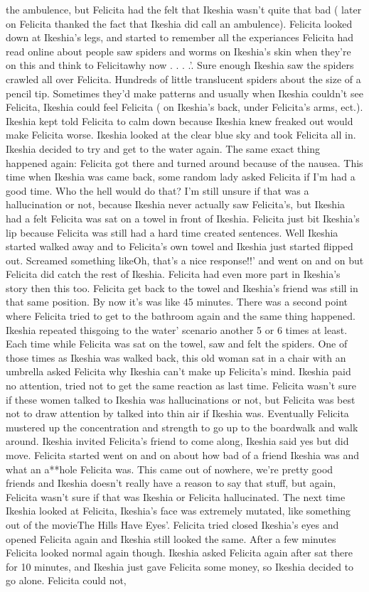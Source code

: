 \documentclass[12pt]{book}
\begin{document}
the ambulence, but Felicita had the felt that Ikeshia wasn't quite that bad ( later on Felicita thanked the fact that Ikeshia did call an ambulence). Felicita looked down at Ikeshia's legs, and started to remember all the experiances Felicita had read online about people saw spiders and worms on Ikeshia's skin when they're on this and think to Felicitawhy now . . .  .'. Sure enough Ikeshia saw the spiders crawled all over Felicita. Hundreds of little translucent spiders about the size of a pencil tip. Sometimes they'd make patterns and usually when Ikeshia couldn't see Felicita, Ikeshia could feel Felicita ( on Ikeshia's back, under Felicita's arms, ect.). Ikeshia kept told Felicita to calm down because Ikeshia knew freaked out would make Felicita worse. Ikeshia looked at the clear blue sky and took Felicita all in. Ikeshia decided to try and get to the water again. The same exact thing happened again: Felicita got there and turned around because of the nausea. This time when Ikeshia was came back, some random lady asked Felicita if I'm had a good time. Who the hell would do that? I'm still unsure if that was a hallucination or not, because Ikeshia never actually saw Felicita's, but Ikeshia had a felt Felicita was sat on a towel in front of Ikeshia. Felicita just bit Ikeshia's lip because Felicita was still had a hard time created sentences. Well Ikeshia started walked away and to Felicita's own towel and Ikeshia just started flipped out. Screamed something likeOh, that's a nice response!!' and went on and on but Felicita did catch the rest of Ikeshia. Felicita had even more part in Ikeshia's story then this too. Felicita get back to the towel and Ikeshia's friend was still in that same position. By now it's was like 45 minutes. There was a second point where Felicita tried to get to the bathroom again and the same thing happened. Ikeshia repeated thisgoing to the water' scenario another 5 or 6 times at least. Each time while Felicita was sat on the towel, saw and felt the spiders. One of those times as Ikeshia was walked back, this old woman sat in a chair with an umbrella asked Felicita why Ikeshia can't make up Felicita's mind. Ikeshia paid no attention, tried not to get the same reaction as last time. Felicita wasn't sure if these women talked to Ikeshia was hallucinations or not, but Felicita was best not to draw attention by talked into thin air if Ikeshia was. Eventually Felicita mustered up the concentration and strength to go up to the boardwalk and walk around. Ikeshia invited Felicita's friend to come along, Ikeshia said yes but did move. Felicita started went on and on about how bad of a friend Ikeshia was and what an a**hole Felicita was. This came out of nowhere, we're pretty good friends and Ikeshia doesn't really have a reason to say that stuff, but again, Felicita wasn't sure if that was Ikeshia or Felicita hallucinated. The next time Ikeshia looked at Felicita, Ikeshia's face was extremely mutated, like something out of the movieThe Hills Have Eyes'. Felicita tried closed Ikeshia's eyes and opened Felicita again and Ikeshia still looked the same. After a few minutes Felicita looked normal again though. Ikeshia asked Felicita again after sat there for 10 minutes, and Ikeshia just gave Felicita some money, so Ikeshia decided to go alone. Felicita could not, 
\end{document}

